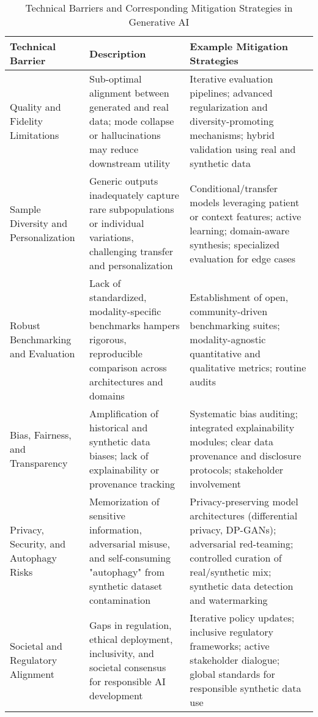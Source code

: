 \documentclass[sigconf]{acmart}
\begin{document}
\begin{table*}[htbp]
\centering
\caption{Technical Barriers and Corresponding Mitigation Strategies in Generative AI}
\label{tab:barriers_mitigation}
\begin{adjustbox}{max width=\textwidth}
\begin{tabular}{@{}lll@{}}
\toprule
Technical Barrier & Description & Example Mitigation Strategies \\
\midrule
Quality and Fidelity Limitations & Sub-optimal alignment between generated and real data; mode collapse or hallucinations may reduce downstream utility~\cite{ref1,ref5,ref18,ref21,ref26,ref76,ref77,ref81,ref88,ref89,ref90} & Iterative evaluation pipelines; advanced regularization and diversity-promoting mechanisms; hybrid validation using real and synthetic data~\cite{ref88,ref89,ref81} \\
Sample Diversity and Personalization & Generic outputs inadequately capture rare subpopulations or individual variations, challenging transfer and personalization~\cite{ref10,ref15,ref21,ref89,ref90,ref101} & Conditional/transfer models leveraging patient or context features; active learning; domain-aware synthesis; specialized evaluation for edge cases~\cite{ref10,ref89} \\
Robust Benchmarking and Evaluation & Lack of standardized, modality-specific benchmarks hampers rigorous, reproducible comparison across architectures and domains~\cite{ref24,ref89,ref68} & Establishment of open, community-driven benchmarking suites; modality-agnostic quantitative and qualitative metrics; routine audits~\cite{ref24,ref89,ref68} \\
Bias, Fairness, and Transparency & Amplification of historical and synthetic data biases; lack of explainability or provenance tracking~\cite{ref7,ref8,ref13,ref67,ref82,ref88} & Systematic bias auditing; integrated explainability modules; clear data provenance and disclosure protocols; stakeholder involvement~\cite{ref7,ref13,ref67,ref88} \\
Privacy, Security, and Autophagy Risks & Memorization of sensitive information, adversarial misuse, and self-consuming "autophagy" from synthetic dataset contamination~\cite{ref9,ref21,ref82,ref88,ref89} & Privacy-preserving model architectures (differential privacy, DP-GANs); adversarial red-teaming; controlled curation of real/synthetic mix; synthetic data detection and watermarking~\cite{ref9,ref13,ref21,ref67,ref82,ref88,ref89} \\
Societal and Regulatory Alignment & Gaps in regulation, ethical deployment, inclusivity, and societal consensus for responsible AI development~\cite{ref7,ref8,ref13,ref24,ref67,ref69,ref82,ref88,ref89} & Iterative policy updates; inclusive regulatory frameworks; active stakeholder dialogue; global standards for responsible synthetic data use~\cite{ref7,ref8,ref67,ref69,ref88,ref89} \\
\bottomrule
\end{tabular}
\end{adjustbox}
\end{table*}
\end{document}

